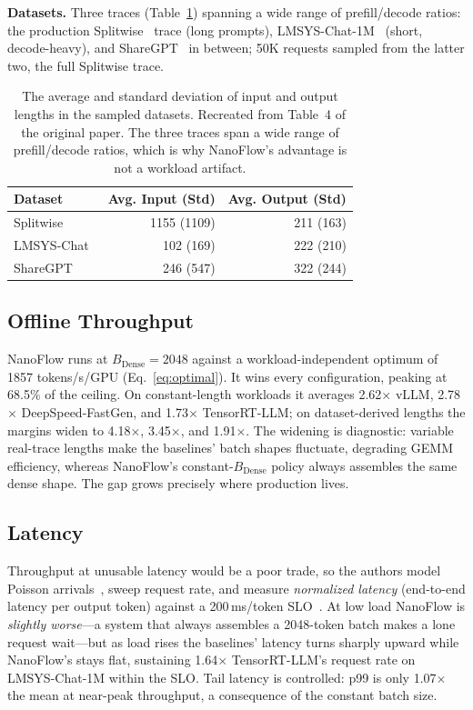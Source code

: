 \documentclass[manuscript,review]{acmart}
\newcommand{\nf}{NanoFlow\xspace}   %
\newcommand{\Bdense}{B_{\mathrm{Dense}}}
\begin{document}
\textbf{Datasets.} Three traces (Table~\ref{tab:datasets}) spanning a wide range of prefill/decode ratios: 
the production Splitwise~\cite{patel2023splitwise} trace (long prompts), LMSYS-Chat-1M~\cite{zheng2023lmsys} 
(short, decode-heavy), and ShareGPT~\cite{sharegpt2023} in between; 50K requests sampled from the latter two, 
the full Splitwise trace.

\begin{table}[t]
\centering
\caption{The average and standard deviation of input and output lengths in the sampled datasets. Recreated 
from Table~4 of the original paper. The three traces span a wide range of prefill/decode ratios, which is why 
\nf's advantage is not a workload artifact.}
\label{tab:datasets}
\begin{tabular}{lrr}
\toprule
\textbf{Dataset} & \textbf{Avg. Input (Std)} & \textbf{Avg. Output (Std)} \\
\midrule
Splitwise~\cite{patel2023splitwise}    & 1155 (1109) & 211 (163) \\
LMSYS-Chat~\cite{zheng2023lmsys}       & 102 (169)   & 222 (210) \\
ShareGPT~\cite{sharegpt2023}           & 246 (547)   & 322 (244) \\
\bottomrule
\end{tabular}
\end{table}

\subsection{Offline Throughput}

\nf runs at $\Bdense = 2048$ against a workload-independent optimum of 1857 tokens/s/GPU (Eq.~\ref{eq:optimal}). 
It wins every configuration, peaking at 68.5\% of the ceiling. On constant-length workloads it averages 
2.62$\times$ vLLM, 2.78$\times$ DeepSpeed-FastGen, and 1.73$\times$ TensorRT-LLM; on dataset-derived lengths 
the margins widen to 4.18$\times$, 3.45$\times$, and 1.91$\times$. The widening is diagnostic: variable 
real-trace lengths make the baselines' batch shapes fluctuate, degrading GEMM efficiency, whereas \nf's 
constant-$\Bdense$ policy always assembles the same dense shape. The gap grows precisely where production lives.

\subsection{Latency}

Throughput at unusable latency would be a poor trade, so the authors model Poisson 
arrivals~\cite{kwon2023efficient}, sweep request rate, and measure \emph{normalized latency} 
(end-to-end latency per output token) against a 200\,ms/token SLO~\cite{zhong2024distserve, brysbaert2019reading}. 
At low load \nf is \emph{slightly worse}---a system that always assembles a 2048-token batch makes a lone request
wait---but as load rises the baselines' latency turns sharply upward while \nf's stays flat, sustaining 
1.64$\times$ TensorRT-LLM's request rate on LMSYS-Chat-1M within the SLO. Tail latency is controlled: p99 is 
only 1.07$\times$ the mean at near-peak throughput, a consequence of the constant batch size.
\end{document}
